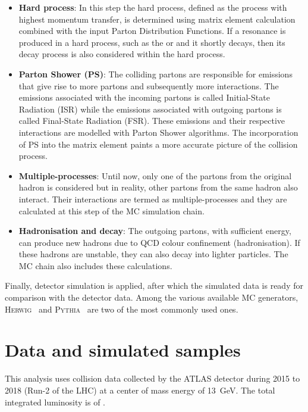 \begin{itemize}
  \item \textbf{Hard process}: In this step the hard process, defined as the process with highest
  momentum transfer, is determined using matrix element calculation combined with the input Parton
  Distribution Functions. If a resonance is produced in a hard process, such as the \Ptop or \PZ and it
  shortly decays, then its decay process is also considered within the hard process. 

  \item \textbf{Parton Shower (PS)}: The colliding partons are responsible for emissions that give rise
  to more partons and subsequently more interactions. The emissions associated with the incoming partons
  is called Initial-State Radiation (ISR) while the emissions associated with outgoing partons is called
  Final-State Radiation (FSR). These emissions and their respective interactions are modelled with
  Parton Shower algorithms. The incorporation of PS into the matrix element paints a more accurate picture
  of the collision process.

  \item \textbf{Multiple-processes}: Until now, only one of the partons from the original hadron is 
  considered but in reality, other partons from the same hadron also interact. Their interactions are
  termed as multiple-processes and they are calculated at this step of the MC simulation chain.
  
  \item \textbf{Hadronisation and decay}: The outgoing partons, with sufficient energy, can produce 
  new hadrons due to QCD colour confinement (hadronisation). If these hadrons are unstable, they can also
  decay into lighter particles. The MC chain also includes these calculations.
\end{itemize}

Finally, detector simulation is applied, after which the simulated data is ready for comparison with the 
detector data.
Among the various available MC generators, \textsc{Herwig}~\cite{Bellm2016} and 
\textsc{Pythia}~\cite{SJOSTRAND2008852} are two of the most commonly used ones.


\section{Data and simulated samples}
This analysis uses collision data collected by the ATLAS detector during 2015 to 2018 (Run-2 of the LHC) at a center of
mass energy of \qty{13}{\GeV}. The total integrated luminosity is of \lumi.

